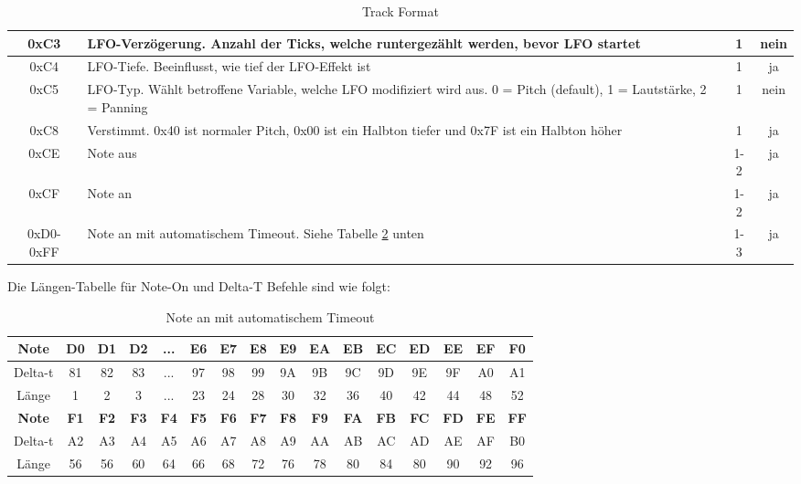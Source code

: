 \documentclass[11pt,a4paper]{scrartcl}
\begin{document}
\begin{table}[!h]
\begin{tabular}{ c | p{11cm}| c | c}
        \hline
        0xC3 & LFO-Verz\"ogerung. Anzahl der Ticks, welche runtergez\"ahlt werden, bevor LFO startet & 1 & nein \\
        \hline
        0xC4 & LFO-Tiefe. Beeinflusst, wie tief der LFO-Effekt ist & 1 & ja \\
        \hline
        0xC5 & LFO-Typ. W\"ahlt betroffene Variable, welche LFO modifiziert wird aus. 0 = Pitch (default), 1 = Lautst\"arke, 2 = Panning& 1 & nein \\
        \hline
        0xC8 & Verstimmt. 0x40 ist normaler Pitch, 0x00 ist ein Halbton tiefer und 0x7F ist ein Halbton h\"oher & 1 & ja \\
        \hline
        0xCE & Note aus & 1-2 & ja \\
        \hline
        0xCF & Note an & 1-2 & ja \\
        \hline
        0xD0-0xFF & Note an mit automatischem Timeout. Siehe Tabelle \ref{table:Timeout} unten & 1-3 & ja \\
    \end{tabular}
    \caption{Track Format}
    \label{table:TrackFormat}
\end{table}
\newpage

Die L\"angen-Tabelle f\"ur Note-On und Delta-T Befehle sind wie folgt:

\begin{table}[h]
    \centering
    \begin{tabular}{ c | c | c | c | c | c | c | c | c | c | c | c | c | c | c | c }
        \textbf{Note} & \textbf{D0} & \textbf{D1} & \textbf{D2} & \textbf{...} & \textbf{E6} & \textbf{E7} & \textbf{E8} & \textbf{E9} & \textbf{EA} & \textbf{EB} & \textbf{EC} & \textbf{ED} & \textbf{EE} & \textbf{EF} & \textbf{F0} \\
        \hline
        Delta-t & 81 & 82 & 83 & ... & 97 & 98 & 99 & 9A & 9B & 9C & 9D & 9E & 9F & A0 & A1 \\
        \hline
        L\"ange & 1 & 2 & 3 & ... & 23 & 24 & 28 & 30 & 32 & 36 & 40 & 42 & 44 & 48 & 52 \\
        \hline
        \hline
        \textbf{Note} & \textbf{F1} & \textbf{F2} & \textbf{F3} & \textbf{F4} & \textbf{F5} & \textbf{F6} & \textbf{F7} & \textbf{F8} & \textbf{F9} & \textbf{FA} & \textbf{FB} & \textbf{FC} & \textbf{FD} & \textbf{FE} & \textbf{FF} \\
        \hline
        Delta-t & A2 & A3 & A4 & A5 & A6 & A7 & A8 & A9 & AA & AB & AC & AD & AE & AF & B0 \\
        \hline
        L\"ange & 56 & 56 & 60 & 64 & 66 & 68 & 72 & 76 & 78 & 80 & 84 & 80 & 90 & 92 & 96 \\
    \end{tabular}
    \caption{Note an mit automatischem Timeout}
    \label{table:Timeout}
\end{table}
\end{document}
